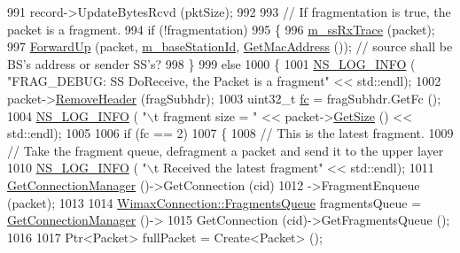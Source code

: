 \begin{DoxyCode}
991           record->UpdateBytesRcvd (pktSize);
992 
993           \textcolor{comment}{// If fragmentation is true, the packet is a fragment.}
994           \textcolor{keywordflow}{if} (!fragmentation)
995             \{
996               \hyperlink{classns3_1_1SubscriberStationNetDevice_a88c8f706dea73606f68daa73703f65b5}{m\_ssRxTrace} (packet);
997               \hyperlink{classns3_1_1WimaxNetDevice_ae6d708e65981c36d43f075527b11eb8d}{ForwardUp} (packet, \hyperlink{classns3_1_1SubscriberStationNetDevice_a9745729222112443a4b527f681537c48}{m\_baseStationId}, 
      \hyperlink{classns3_1_1WimaxNetDevice_aa02eb7f6de9c03f0b8f2e33e3c5b5559}{GetMacAddress} ()); \textcolor{comment}{// source shall be BS's address or sender SS's?}
998             \}
999           \textcolor{keywordflow}{else}
1000             \{
1001               \hyperlink{group__logging_gafbd73ee2cf9f26b319f49086d8e860fb}{NS\_LOG\_INFO} ( \textcolor{stringliteral}{"FRAG\_DEBUG: SS DoReceive, the Packet is a fragment"} << std::endl);
1002               packet->\hyperlink{classns3_1_1Packet_a0961eccf975d75f902d40956c93ba63e}{RemoveHeader} (fragSubhdr);
1003               uint32\_t \hyperlink{generate__test__data__lte__spectrum__model_8m_a72d54db2b27ce046aab6e6a414c407e9}{fc} = fragSubhdr.GetFc ();
1004               \hyperlink{group__logging_gafbd73ee2cf9f26b319f49086d8e860fb}{NS\_LOG\_INFO} ( \textcolor{stringliteral}{"\(\backslash\)t fragment size = "} << packet->\hyperlink{classns3_1_1Packet_a462855c9929954d4301a4edfe55f4f1c}{GetSize} () << std::endl);
1005 
1006               \textcolor{keywordflow}{if} (fc == 2)
1007                 \{
1008                   \textcolor{comment}{// This is the latest fragment.}
1009                   \textcolor{comment}{// Take the fragment queue, defragment a packet and send it to the upper layer}
1010                   \hyperlink{group__logging_gafbd73ee2cf9f26b319f49086d8e860fb}{NS\_LOG\_INFO} ( \textcolor{stringliteral}{"\(\backslash\)t Received the latest fragment"} << std::endl);
1011                   \hyperlink{classns3_1_1WimaxNetDevice_a25450b18f62f91e4c2ab08485bd171a2}{GetConnectionManager} ()->GetConnection (cid)
1012                   ->FragmentEnqueue (packet);
1013 
1014                   \hyperlink{classns3_1_1WimaxConnection_acebd6aa95ab519f5e19bd1773f62e506}{WimaxConnection::FragmentsQueue} fragmentsQueue = 
      \hyperlink{classns3_1_1WimaxNetDevice_a25450b18f62f91e4c2ab08485bd171a2}{GetConnectionManager} ()->
1015                     GetConnection (cid)->GetFragmentsQueue ();
1016 
1017                   Ptr<Packet> fullPacket = Create<Packet> ();

\end{DoxyCode}

